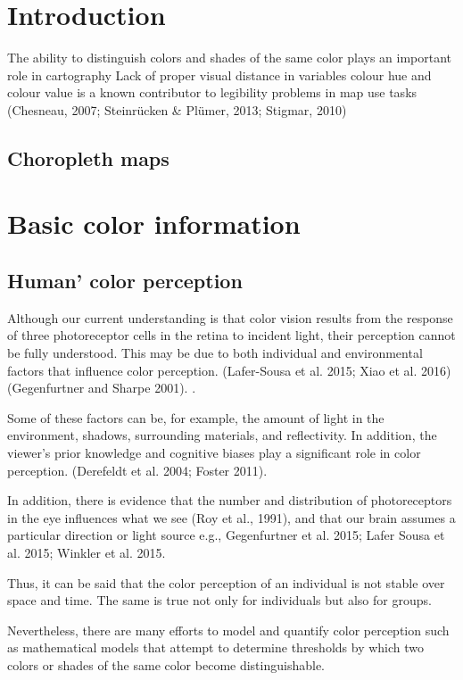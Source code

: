 \section{Introduction}
The ability to distinguish colors and shades of the same color plays an important role in cartography \parencite{coltekin2017}
Lack of proper visual distance in variables colour hue and colour value is a known contributor to legibility problems in map use tasks (Chesneau, 2007; Steinrücken & Plümer, 2013; Stigmar, 2010)\parencite{brychtova2015}
\subsection{Choropleth maps}

\section{Basic color information}

\subsection{Human' color perception}
Although our current understanding is that color vision results from the response of three photoreceptor cells in the retina to incident light, their perception cannot be fully understood. This may be due to both individual and environmental factors that influence color perception. (Lafer-Sousa et al. 2015; Xiao et al. 2016) (Gegenfurtner and Sharpe 2001). .

Some of these factors can be, for example, the amount of light in the environment, shadows, surrounding materials, and reflectivity. In addition, the viewer's prior knowledge and cognitive biases play a significant role in color perception. (Derefeldt et al. 2004; Foster 2011). 

In addition, there is evidence that the number and distribution of photoreceptors in the eye influences what we see (Roy et al., 1991), and that our brain assumes a particular direction or light source e.g., Gegenfurtner et al. 2015; Lafer Sousa et al. 2015; Winkler et al. 2015. 

Thus, it can be said that the color perception of an individual is not stable over space and time. The same is true not only for individuals but also for groups.  

Nevertheless, there are many efforts to model and quantify color perception such as mathematical models that attempt to determine thresholds by which two colors or shades of the same color become distinguishable. 

